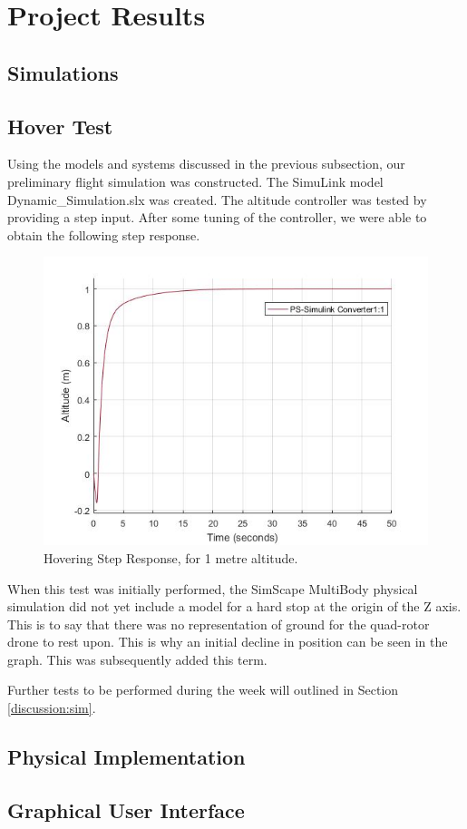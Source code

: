 
\section{Project Results}

\subsection{Simulations}
\subsection{Hover Test}
Using the models and systems discussed in the previous subsection, our preliminary flight simulation was constructed.  The SimuLink model Dynamic\_Simulation.slx was created.  The altitude controller was tested by providing a step input.  After some tuning of the controller, we were able to obtain the following step response.

\begin{figure}[h]
	\centering
	\includegraphics[scale = 0.5]{stepresponse.jpg}
	\caption{Hovering Step Response, for 1 metre altitude.}
	\label{fig:1m_step}
\end{figure}

When this test was initially performed, the SimScape MultiBody physical simulation did not yet include a model for a hard stop at the origin of the Z axis.  This is to say that there was no representation of ground for the quad-rotor drone to rest upon.  This is why an initial decline in position can be seen in the graph.  This was subsequently added this term.

Further tests to be performed during the week will outlined in Section \ref{discussion:sim}.



\subsection{Physical Implementation}


\subsection{Graphical User Interface}

